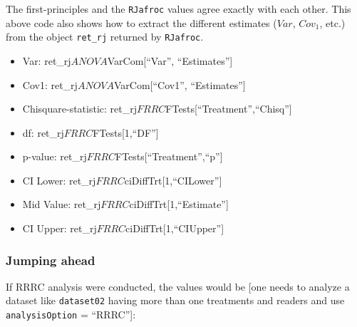 \documentclass[
]{book}
\providecommand{\tightlist}{%
  \setlength{\itemsep}{0pt}\setlength{\parskip}{0pt}}
\begin{document}
The first-principles and the \texttt{RJafroc} values agree exactly with each other. This above code also shows how to extract the different estimates (\(Var\), \(Cov_1\), etc.) from the object \texttt{ret\_rj} returned by \texttt{RJafroc}.

\begin{itemize}
\tightlist
\item
  Var: ret\_rj\(ANOVA\)VarCom{[}``Var'', ``Estimates''{]}
\item
  Cov1: ret\_rj\(ANOVA\)VarCom{[}``Cov1'', ``Estimates''{]}
\item
  Chisquare-statistic: ret\_rj\(FRRC\)FTests{[}``Treatment'',``Chisq''{]}
\item
  df: ret\_rj\(FRRC\)FTests{[}1,``DF''{]}
\item
  p-value: ret\_rj\(FRRC\)FTests{[}``Treatment'',``p''{]}
\item
  CI Lower: ret\_rj\(FRRC\)ciDiffTrt{[}1,``CILower''{]}
\item
  Mid Value: ret\_rj\(FRRC\)ciDiffTrt{[}1,``Estimate''{]}
\item
  CI Upper: ret\_rj\(FRRC\)ciDiffTrt{[}1,``CIUpper''{]}
\end{itemize}

\hypertarget{jumping-ahead}{%
\subsubsection{Jumping ahead}\label{jumping-ahead}}

If RRRC analysis were conducted, the values would be {[}one needs to analyze a dataset like \texttt{dataset02} having more than one treatments and readers and use \texttt{analysisOption} = ``RRRC''{]}:
\end{document}
